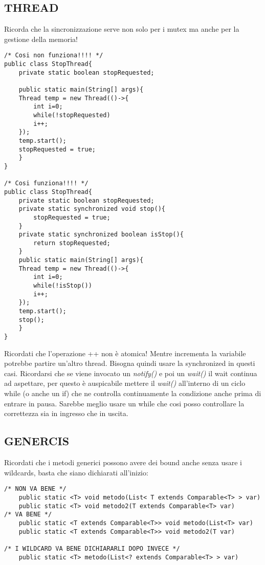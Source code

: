 \subsection{THREAD}
\noindent Ricorda che la sincronizzazione serve non solo per i mutex ma anche per la gestione della memoria!
\begin{lstlisting}
/* Cosi non funziona!!!! */
public class StopThread{
	private static boolean stopRequested;
	
	public static main(String[] args){
	Thread temp = new Thread(()->{
		int i=0;
		while(!stopRequested)
		i++;
	});
	temp.start();
	stopRequested = true;
	}
}

/* Cosi funziona!!!! */
public class StopThread{
	private static boolean stopRequested;
	private static synchronized void stop(){
		stopRequested = true;
	}
	private static synchronized boolean isStop(){
		return stopRequested;
	}	
	public static main(String[] args){
	Thread temp = new Thread(()->{
		int i=0;
		while(!isStop())
		i++;
	});
	temp.start();
	stop();
	}
}
\end{lstlisting}

\noindent Ricordati che l'operazione ++ non è atomica! Mentre incrementa la variabile potrebbe partire un'altro thread. Bisogna quindi usare la synchronized in questi casi. \newline
Ricordarsi che se viene invocato un \textit{notify()} e poi un \textit{wait()} il wait continua ad aspettare, per questo è auspicabile mettere il \textit{wait()} all'interno di un ciclo while (o anche un if) che ne controlla continuamente la condizione anche prima di entrare in pausa. Sarebbe meglio usare un while che cosi posso controllare la correttezza sia in ingresso che in uscita.

\subsection{GENERCIS}
\noindent Ricordati che i metodi generici possono avere dei bound anche senza usare i wildcards, basta che siano dichiarati all'inizio:
\begin{lstlisting}
/* NON VA BENE */
	public static <T> void metodo(List< T extends Comparable<T> > var)
	public static <T> void metodo2(T extends Comparable<T> var)
/* VA BENE */
	public static <T extends Comparable<T>> void metodo(List<T> var)
	public static <T extends Comparable<T>> void metodo2(T var)	
	
/* I WILDCARD VA BENE DICHIARARLI DOPO INVECE */
	public static <T> metodo(List<? extends Comparable<T> > var)
\end{lstlisting}

